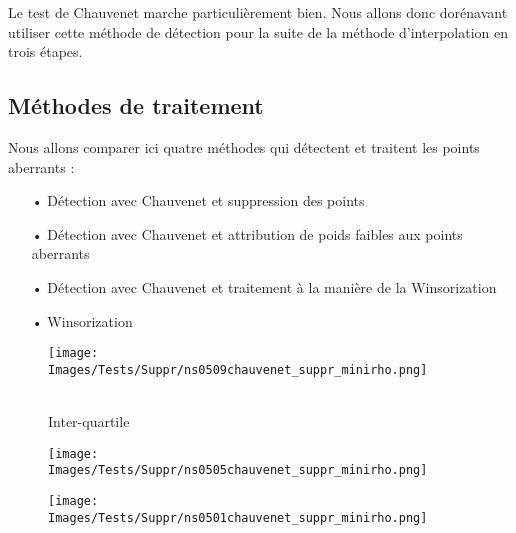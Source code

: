 \documentclass[a4paper,12pt]{article} %
\begin{document}
            
        Le test de Chauvenet marche particulièrement bien. Nous allons donc dorénavant utiliser cette méthode de détection pour la suite de la méthode d'interpolation en trois étapes.
        
        \subsection{Méthodes de traitement}
        
        Nous allons comparer ici quatre méthodes qui détectent et traitent les points aberrants :
        \begin{itemize}
            \item[•] Détection avec Chauvenet et suppression des points
            \item[•] Détection avec Chauvenet et attribution de poids faibles aux points aberrants
            \item[•] Détection avec Chauvenet et traitement à la manière de la Winsorization
            \item[•] Winsorization
        \end{itemize}
        
        \begin{figure}[H] %
            \texttt{[image: Images/Tests/Suppr/ns0509chauvenet\_suppr\_minirho.png]} %
            \caption{\\Inter-quartile} %
            \label{m15} %
            \endminipage
            \hfill
            \endminipage
            \texttt{[image: Images/Tests/Suppr/ns0505chauvenet\_suppr\_minirho.png]}  
            \caption{}
            \label{m5}
            \endminipage
            \hfill
            \endminipage
            \texttt{[image: Images/Tests/Suppr/ns0501chauvenet\_suppr\_minirho.png]}  
            \caption{}
            \label{m35}
            \endminipage
        \end{figure}
        
\end{document}
